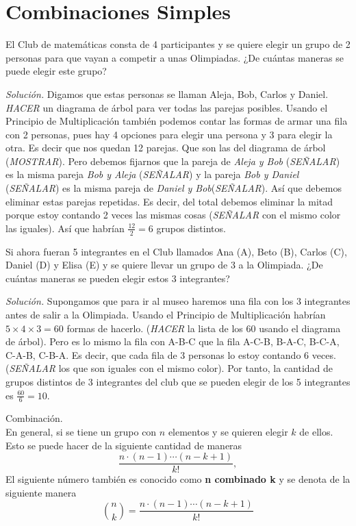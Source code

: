 \chapter{Combinaciones Simples}

\begin{ejemplo}
El Club de matemáticas consta de 4 participantes y se quiere elegir un grupo de 2 personas para que vayan a competir a unas Olimpiadas. ¿De cuántas maneras se puede elegir este grupo?
\end{ejemplo}

\textit{Solución.} Digamos que estas personas se llaman Aleja, Bob, Carlos y Daniel. \textit{HACER} un diagrama de árbol para ver todas las parejas posibles. Usando el Principio de Multiplicación también podemos contar las formas de armar una fila con 2 personas, pues hay 4 opciones para elegir una persona y 3 para elegir la otra. Es decir que nos quedan 12 parejas. Que son las del diagrama de árbol (\textit{MOSTRAR}). Pero debemos fijarnos que la pareja de \textit{Aleja y Bob} (\textit{SEÑALAR}) es la misma pareja \textit{Bob y Aleja} (\textit{SEÑALAR}) y la pareja \textit{Bob y Daniel} (\textit{SEÑALAR}) es la misma pareja de \textit{Daniel y Bob}(\textit{SEÑALAR}). Así que debemos eliminar estas parejas repetidas. Es decir, del total debemos eliminar la mitad porque estoy contando 2 veces las mismas cosas (\textit{SEÑALAR} con el mismo color las iguales). Así que habrían $\frac{12}{2}=6$ grupos distintos.

\begin{ejemplo}
Si ahora fueran 5 integrantes en el Club llamados Ana (A), Beto (B), Carlos (C), Daniel (D) y Elisa (E) y se quiere llevar un grupo de 3 a la Olimpiada. ¿De cuántas maneras se pueden elegir estos 3 integrantes?
\label{integrantesclubcombinaciones}
\end{ejemplo}

\textit{Solución. }Supongamos que para ir al museo haremos una fila con los 3 integrantes antes de salir a la Olimpiada. Usando el Principio de Multiplicación habrían $5\times 4\times 3=60$ formas de hacerlo. (\textit{HACER} la lista de los 60 usando el diagrama de árbol). Pero es lo mismo la fila con A-B-C que la fila A-C-B, B-A-C, B-C-A, C-A-B, C-B-A. Es decir, que cada fila de 3 personas lo estoy contando 6 veces. (\textit{SEÑALAR} los que son iguales con el mismo color). Por tanto, la cantidad de grupos distintos de 3 integrantes del club que se pueden elegir de los 5 integrantes es $\frac{60}{6}=10$.

\begin{defi}{Combinación.\\}
En general, si se tiene un grupo con $n$ elementos y se quieren elegir $k$ de ellos. Esto se puede hacer de la siguiente cantidad de maneras $$\frac{n\cdot(n-1)\cdots (n-k+1)}{k!},$$ El siguiente número también es conocido como \textbf{n combinado k} y se denota de la siguiente manera $$ \binom{n}{k}=\frac{n\cdot(n-1)\cdots (n-k+1)}{k!}$$
\label{Combinaciondefi}
\end{defi}

